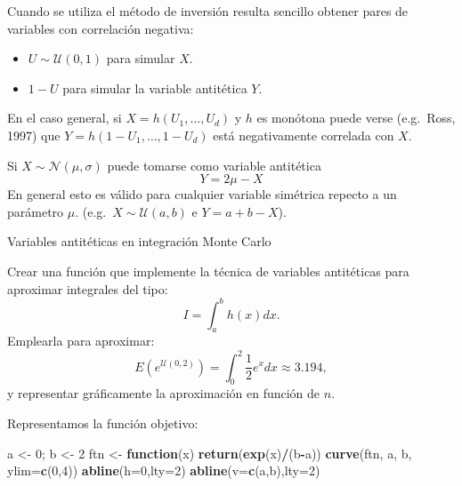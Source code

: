 \documentclass[
]{book}
\newenvironment{Shaded}{\begin{snugshade}}{\end{snugshade}}
\newcommand{\ControlFlowTok}[1]{\textcolor[rgb]{0.13,0.29,0.53}{\textbf{#1}}}
\newcommand{\DataTypeTok}[1]{\textcolor[rgb]{0.13,0.29,0.53}{#1}}
\newcommand{\DecValTok}[1]{\textcolor[rgb]{0.00,0.00,0.81}{#1}}
\newcommand{\KeywordTok}[1]{\textcolor[rgb]{0.13,0.29,0.53}{\textbf{#1}}}
\newcommand{\NormalTok}[1]{#1}
\newcommand{\OperatorTok}[1]{\textcolor[rgb]{0.81,0.36,0.00}{\textbf{#1}}}
\newcommand{\StringTok}[1]{\textcolor[rgb]{0.31,0.60,0.02}{#1}}
\theoremstyle{break}
\theoremstyle{definition}
\theoremstyle{definition}
\theoremstyle{definition}
\theoremstyle{remark}
\let\BeginKnitrBlock\begin \let\EndKnitrBlock\end
\begin{document}
Cuando se utiliza el método de inversión resulta sencillo obtener
pares de variables con correlación negativa:

\begin{itemize}
\item
  \(U\sim \mathcal{U}\left( 0,1\right)\) para simular \(X\).
\item
  \(1-U\) para simular la variable antitética \(Y\).
\end{itemize}

En el caso general, si \(X=h\left( U_{1},\ldots,U_{d}\right)\) y
\(h\) es monótona puede verse (e.g.~Ross, 1997) que
\(Y=h\left( 1-U_{1},\ldots,1-U_{d}\right)\) está negativamente
correlada con \(X\).

Si \(X\sim \mathcal{N}(\mu,\sigma)\) puede tomarse como variable
antitética \[Y=2\mu-X\]
En general esto es válido para cualquier variable
simétrica repecto a un parámetro \(\mu\).
(e.g.~\(X\sim \mathcal{U}(a,b)\) e \(Y=a+b-X\)).

\BeginKnitrBlock{exercise}
\protect\hypertarget{exr:mc-integrala}{}{\label{exr:mc-integrala} }Variables antitéticas en integración Monte Carlo
\EndKnitrBlock{exercise}

Crear una función que implemente la técnica de variables antitéticas para aproximar integrales del tipo:
\[I=\int_{a}^{b}h\left(  x\right)  dx.\]
Emplearla para aproximar:
\[E\left(  e^{\mathcal{U}(0,2)}\right)  =\int_{0}^{2}\frac{1}{2}e^{x}dx\approx3.194,\label{integralmc}\]
y representar gráficamente la aproximación en función de \(n\).

Representamos la función objetivo:

\begin{Shaded}
\begin{Highlighting}[]
\NormalTok{a <-}\StringTok{ }\DecValTok{0}\NormalTok{; b <-}\StringTok{ }\DecValTok{2}
\NormalTok{ftn <-}\StringTok{ }\ControlFlowTok{function}\NormalTok{(x) }\KeywordTok{return}\NormalTok{(}\KeywordTok{exp}\NormalTok{(x)}\OperatorTok{/}\NormalTok{(b}\OperatorTok{-}\NormalTok{a))}
\KeywordTok{curve}\NormalTok{(ftn, a, b, }\DataTypeTok{ylim=}\KeywordTok{c}\NormalTok{(}\DecValTok{0}\NormalTok{,}\DecValTok{4}\NormalTok{))}
\KeywordTok{abline}\NormalTok{(}\DataTypeTok{h=}\DecValTok{0}\NormalTok{,}\DataTypeTok{lty=}\DecValTok{2}\NormalTok{)}
\KeywordTok{abline}\NormalTok{(}\DataTypeTok{v=}\KeywordTok{c}\NormalTok{(a,b),}\DataTypeTok{lty=}\DecValTok{2}\NormalTok{)}
\end{Highlighting}
\end{Shaded}
\end{document}
